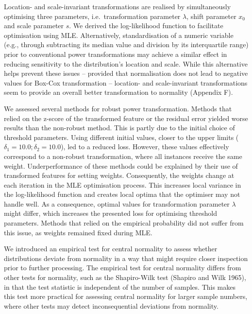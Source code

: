 \documentclass[preprint,12pt,authoryear]{elsarticle}
\begin{document}
Location- and scale-invariant transformations are realised by
simultaneously optimising three parameters, i.e.~transformation
parameter \(\lambda\), shift parameter \(x_0\) and scale parameter
\(s\). We derived the log-likelihood function to facilitate optimisation
using MLE. Alternatively, standardisation of a numeric variable (e.g.,
through subtracting its median value and division by its interquartile
range) prior to conventional power transformations may achieve a similar
effect in reducing sensitivity to the distribution's location and scale.
While this alternative helps prevent these issues -- provided that
normalisation does not lead to negative values for Box-Cox
transformation -- location- and scale-invariant transformations seem to
provide an overall better transformation to normality (Appendix F).

We assessed several methods for robust power transformation. Methods
that relied on the z-score of the transformed feature or the residual
error yielded worse results than the non-robust method. This is partly
due to the initial choice of threshold parameters. Using different
initial values, closer to the upper limits
(\(\delta_1 = 10.0; \delta_2 = 10.0\)), led to a reduced loss. However,
these values effectively correspond to a non-robust transformation,
where all instances receive the same weight. Underperformance of these
methods could be explained by their use of transformed features for
setting weights. Consequently, the weights change at each iteration in
the MLE optimisation process. This increases local variance in the
log-likelihood function and creates local optima that the optimiser may
not handle well. As a consequence, optimal values for transformation
parameter \(\lambda\) might differ, which increases the presented loss
for optimising threshold parameters. Methods that relied on the
empirical probability did not suffer from this issue, as weights
remained fixed during MLE.

We introduced an empirical test for central normality to assess whether
distributions deviate from normality in a way that might require closer
inspection prior to further processing. The empirical test for central
normality differs from other tests for normality, such as the
Shapiro-Wilk test (Shapiro and Wilk 1965), in that the test statistic is
independent of the number of samples. This makes this test more
practical for assessing central normality for larger sample numbers,
where other tests may detect inconsequential deviations from normality.
\end{document}

